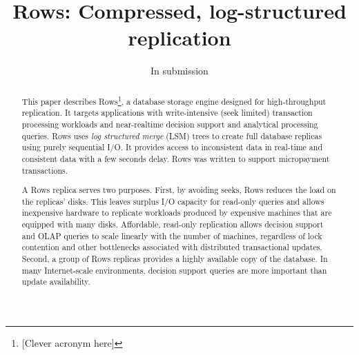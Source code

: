 \documentclass{sig-alternate-sigmod08}
\newcommand{\rows}{Rows\xspace}
\begin{document}
%

\title{{\ttlit \rows}: Compressed, log-structured replication}
%
%
\author{In submission}
\maketitle
\begin{abstract}
This paper describes \rows\footnote{[Clever acronym here]}, a database
storage engine designed for high-throughput replication.  It targets
applications with write-intensive (seek limited) transaction
processing workloads and near-realtime decision support and analytical
processing queries.  \rows uses {\em log structured merge} (LSM) trees
to create full database replicas using purely sequential I/O.  It
provides access to inconsistent data in real-time and consistent data
with a few seconds delay.  \rows was written to support micropayment
transactions.  

A \rows replica serves two purposes.  First, by avoiding seeks, \rows
reduces the load on the replicas' disks.  This leaves surplus I/O capacity
for read-only queries and allows inexpensive hardware to replicate
workloads produced by expensive machines that are equipped with many disks.
Affordable, read-only replication allows decision support and OLAP queries to
scale linearly with the number of machines, regardless of lock
contention and other bottlenecks associated with distributed
transactional updates.  Second, a group of \rows replicas provides a highly
available copy of the database.  In many Internet-scale environments,
decision support queries are more important than update availability.



\end{abstract}
\end{document}
